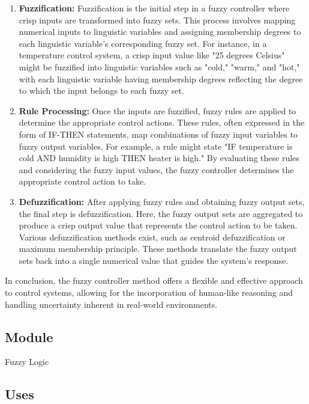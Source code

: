\documentclass[12pt, titlepage]{article}
\begin{document}
\begin{enumerate}
  \item \textbf{Fuzzification:}
  Fuzzification is the initial step in a fuzzy controller where
  crisp inputs are transformed into fuzzy sets. This process 
  involves mapping numerical inputs to linguistic variables and 
  assigning membership degrees to each linguistic variable's 
  corresponding fuzzy set. For instance, in a temperature 
  control system, a crisp input value like "25 degrees Celsius" 
  might be fuzzified into linguistic variables such as "cold," 
  "warm," and "hot," with each linguistic variable having 
  membership degrees reflecting the degree to which the 
  input belongs to each fuzzy set.
   
  \item \textbf{Rule Processing:}
  Once the inputs are fuzzified, fuzzy rules are applied 
  to determine the appropriate control actions. These rules, 
  often expressed in the form of IF-THEN statements, map combinations 
  of fuzzy input variables to fuzzy output variables. For example, 
  a rule might state "IF temperature is cold AND humidity is high 
  THEN heater is high." By evaluating these rules and considering 
  the fuzzy input values, the fuzzy controller determines the 
  appropriate control action to take.
   
  \item \textbf{Defuzzification:}
  After applying fuzzy rules and obtaining fuzzy output sets, 
  the final step is defuzzification. Here, the fuzzy output sets 
  are aggregated to produce a crisp output value that represents 
  the control action to be taken. Various defuzzification 
  methods exist, such as centroid defuzzification or maximum 
  membership principle. These methods translate the fuzzy output 
  sets back into a single numerical value that guides the system's response.
\end{enumerate}

In conclusion, the fuzzy controller method offers a flexible and effective 
approach to control systems, allowing for the incorporation of human-like 
reasoning and handling uncertainty inherent in real-world environments.

\subsection{Module}

Fuzzy Logic

\subsection{Uses}
\end{document}
